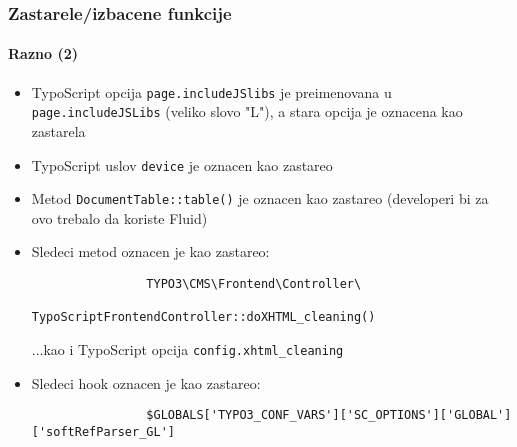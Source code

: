 \begin{frame}[fragile]
	\frametitle{Zastarele/izbacene funkcije}
	\framesubtitle{Razno (2)}

	\begin{itemize}
		\item TypoScript opcija \texttt{page.includeJSlibs} je preimenovana u\newline
			\texttt{page.includeJSLibs} (veliko slovo "L"), a stara opcija je oznacena kao zastarela

		\item TypoScript uslov \texttt{device} je oznacen kao zastareo

		\item Metod \texttt{DocumentTable::table()} je oznacen kao zastareo\newline
			\small(developeri bi za ovo trebalo da koriste Fluid)\normalsize

		\item Sledeci metod oznacen je kao zastareo:
			\begin{lstlisting}
				TYPO3\CMS\Frontend\Controller\
				    TypoScriptFrontendController::doXHTML_cleaning()
			\end{lstlisting}
			...kao i TypoScript opcija
			\small
				\texttt{config.xhtml\_cleaning}
			\normalsize

		\item Sledeci hook oznacen je kao zastareo:
			\begin{lstlisting}
				$GLOBALS['TYPO3_CONF_VARS']['SC_OPTIONS']['GLOBAL']['softRefParser_GL']
			\end{lstlisting}

	\end{itemize}

\end{frame}


